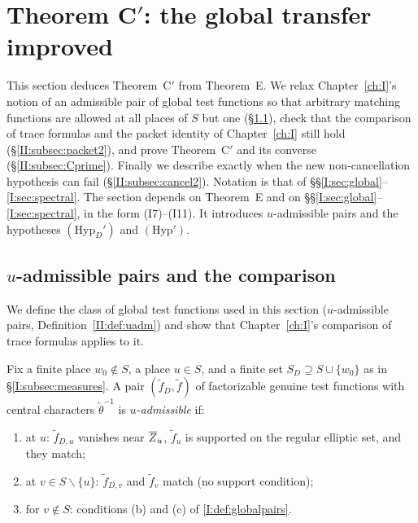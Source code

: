 \section{\texorpdfstring{Theorem C$'$: the global transfer improved}{Theorem C': the global transfer improved}}\label{II:sec:CC}
This section deduces Theorem~C$'$ from Theorem~E. We relax Chapter~\ref{ch:I}'s notion of an admissible pair of global test functions so that arbitrary matching functions are allowed at all places of $S$ but one (\S\ref{II:subsec:uadm}), check that the comparison of trace formulas and the packet identity of Chapter~\ref{ch:I} still hold (\S\ref{II:subsec:packet2}), and prove Theorem~C$'$ and its converse (\S\ref{II:subsec:Cprime}). Finally we describe exactly when the new non-cancellation hypothesis can fail (\S\ref{II:subsec:cancel2}). Notation is that of \S\S\ref{I:sec:global}--\ref{I:sec:spectral}. The section depends on Theorem~E and on \S\S\ref{I:sec:global}--\ref{I:sec:spectral}, in the form (I7)--(I11). It introduces $u$-admissible pairs and the hypotheses $(\mathrm{Hyp}_D')$ and $(\mathrm{Hyp}')$.

\subsection{$u$-admissible pairs and the comparison}\label{II:subsec:uadm}
We define the class of global test functions used in this section ($u$-admissible pairs, Definition~\ref{II:def:uadm}) and show that Chapter~\ref{ch:I}'s comparison of trace formulas applies to it.

\begin{definition}\label{II:def:uadm}
Fix a finite place $w_0\notin S$, a place $u\in S$, and a finite set $S_D\supseteq S\cup\{w_0\}$ as in \S\ref{I:subsec:measures}. A pair $(\tilde f_D,\tilde f)$ of factorizable genuine test functions with central characters $\tilde\theta^{-1}$ is \emph{$u$-admissible} if:
\begin{enumerate}[label=(\alph*)]
\item at $u$: $\tilde f_{D,u}$ vanishes near $\overline{Z}_u$, $\tilde f_u$ is supported on the regular elliptic set, and they match;
\item at $v\in S\smallsetminus\{u\}$: $\tilde f_{D,v}$ and $\tilde f_v$ match (no support condition);
\item for $v\notin S$: conditions (b) and (c) of \cref{I:def:globalpairs}.
\end{enumerate}
\end{definition}

